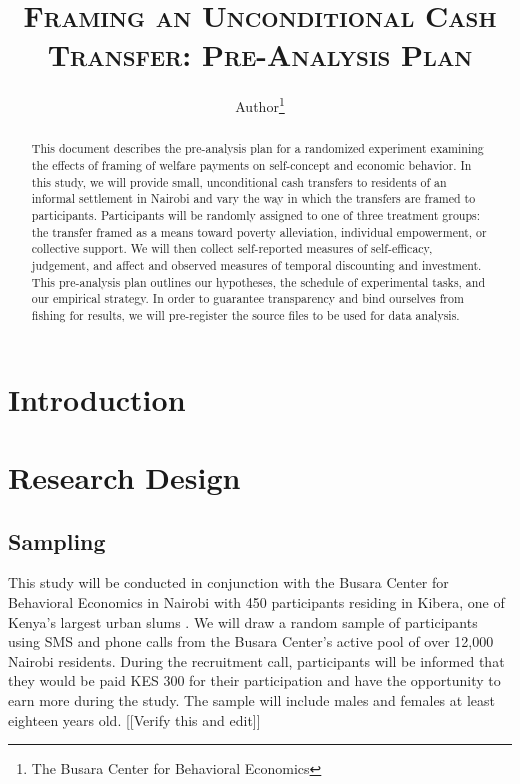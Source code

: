 \documentclass[11pt, a4paper]{article}\usepackage[]{graphicx}\usepackage[]{color}
\begin{document}
\title{\textsc{Framing an Unconditional Cash Transfer: Pre-Analysis Plan}}
\author{Author\footnote{The Busara Center for Behavioral Economics}}

\maketitle

\begin{abstract}

    This document describes the pre-analysis plan for a randomized experiment examining the effects of framing of welfare payments on self-concept and economic behavior. In this study, we will provide small, unconditional cash transfers to residents of an informal settlement in Nairobi and vary the way in which the transfers are framed to participants. Participants will be randomly assigned to one of three treatment groups: the transfer framed as a means toward poverty alleviation, individual empowerment, or collective support. We will then collect self-reported measures of self-efficacy, judgement, and affect and observed measures of temporal discounting and investment. This pre-analysis plan outlines our hypotheses, the schedule of experimental tasks, and our empirical strategy. In order to guarantee transparency and bind ourselves from fishing for results, we will pre-register the source files to be used for data analysis.

\end{abstract}

\newpage

\tableofcontents

\newpage

\section{Introduction}

\section{Research Design}

    \subsection{Sampling}

        This study will be conducted in conjunction with the Busara Center for Behavioral Economics in Nairobi with 450 participants residing in Kibera, one of Kenya's largest urban slums \parencite{haushofer_methodology_2014}. We will draw a random sample of participants using SMS and phone calls from the Busara Center's active pool of over 12,000 Nairobi residents. During the recruitment call, participants will be informed that they would be paid KES 300 for their participation and have the opportunity to earn more during the study. The sample will include males and females at least eighteen years old. [[Verify this and edit]]
\end{document}

